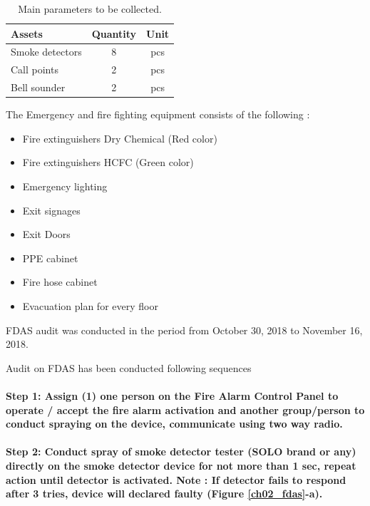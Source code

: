 \begin{table}[h]
	\caption{Main parameters to be collected.}
	\label{ch02_tbl_fdas01}
	{\footnotesize
	\begin{tabular}{l|l|l}
		\hline
		Assets & Quantity & Unit \\ 
		\hline
		Smoke detectors & \multicolumn{1}{c|}{8} & \multicolumn{1}{c}{pcs} \\ 
		Call points & \multicolumn{1}{c|}{2} & \multicolumn{1}{c}{pcs} \\ 
		Bell sounder & \multicolumn{1}{c|}{2} & \multicolumn{1}{c}{pcs} \\ 
		\hline
	\end{tabular}
	}
\end{table}

The Emergency and fire fighting equipment consists of the following :
\begin{itemize}
\item Fire extinguishers Dry Chemical (Red color)
\item Fire extinguishers HCFC (Green color)
\item Emergency lighting 
\item Exit signages
\item Exit Doors
\item PPE cabinet
\item Fire hose cabinet
\item Evacuation plan for every floor
\end{itemize}

FDAS audit was conducted in the period from October 30, 2018 to November 16, 2018.


Audit on FDAS has been conducted following sequences

\paragraph{Step 1: Assign (1) one person on the Fire Alarm Control Panel  to operate / accept  the fire alarm activation and another group/person to conduct spraying on the device, communicate using two way radio.}

\paragraph{Step 2: Conduct spray of smoke detector tester (SOLO brand or any) directly on the smoke detector device for not more than 1 sec, repeat action until detector is activated. Note : If detector fails to respond after 3 tries,  device will declared faulty (Figure \ref{ch02_fdas}-a).}

